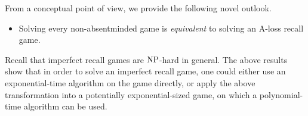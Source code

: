 From a conceptual point of view, we provide the following novel outlook.
\begin{itemize}
	\item Solving every non-absentminded game is \emph{equivalent} to solving an A-loss recall game. 
\end{itemize}

Recall that imperfect recall games are $\operatorname{NP}$-hard in general. The above results show that in order to solve an imperfect recall game, one could either use an exponential-time algorithm on the game directly, or apply the above transformation into a potentially exponential-sized game, on which a polynomial-time algorithm can be used. 








